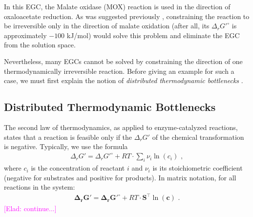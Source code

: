 \documentclass[twocolumn]{bmcart}%
\newcommand{\elad}[1]{{\textcolor{magenta}{[Elad: {#1}]}}}
\begin{document}
In this EGC, the Malate oxidase (MOX) reaction is used in the direction of oxaloacetate reduction. As was suggested previously \cite{Fritzemeier2017-ba}, constraining the reaction to be irreversible only in the direction of malate oxidation (after all, its $\Delta_r G'^\circ$ is approximately $-100$ kJ/mol) would solve this problem and eliminate the EGC from the solution space.

Nevertheless, many EGCs cannot be solved by constraining the direction of one thermodynamically irreversible reaction. Before giving an example for such a case, we must first explain the notion of \emph{distributed thermodynamic bottlenecks} \cite{Mavrovouniotis1996-dq, Mavrovouniotis1993-zq}.

\subsection*{Distributed Thermodynamic Bottlenecks}
The second law of thermodynamics, as applied to enzyme-catalyzed reactions, states that a reaction is feasible only if the $\Delta_r G'$ of the chemical transformation is negative. Typically, we use the formula
\begin{eqnarray}
	\Delta_r G' = \Delta_r G'^\circ + RT \cdot \sum_i \nu_i \ln(c_i)\,\,,
\end{eqnarray}
where $c_i$ is the concentration of reactant $i$ and $\nu_i$ is its stoichiometric coefficient (negative for substrates and positive for products). In matrix notation, for all reactions in the system:
\begin{eqnarray}
\mathbf{\Delta_r G'} = \mathbf{\Delta_r G'^\circ} + RT \cdot \mathbf{S}^\top \ln(\mathbf{c})\,\,.
\end{eqnarray}
\elad{continue...}
\end{document}
